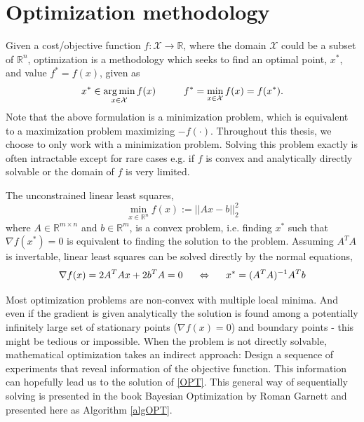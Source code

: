 \section{Optimization methodology}
Given a cost/objective function $f: \mathcal{X} \rightarrow \mathbb{R}$, where the domain
$\mathcal{X}$ could be a subset of $\mathbb{R}^n$,
optimization is a methodology which seeks to find an optimal point, $x^*$, and value
$f^* = f(x)$, given as
\begin{align}\label{OPT}
    x^* \in \operatorname*{arg\,min}_{x \in \mathcal{X}} f(x) \hspace{1cm} f^* = \min_{x \in \mathcal{X}} f(x) = f(x^*).
\end{align}
Note that the above formulation is a minimization problem, which is equivalent to a
maximization problem maximizing $-f(\cdot)$. Throughout this thesis, we choose to only work
with a minimization problem. 
Solving this problem exactly is often intractable except for rare cases e.g. if $f$ is 
convex and analytically directly solvable or the domain of $f$ is very limited.

\begin{testexample}
    The unconstrained linear least squares, $$\min_{x\in \mathbb{R}^n} f(x) := ||Ax-b||_2^2$$
    where $A \in \mathbb{R}^{m\times n}$ and $b \in \mathbb{R}^m$, is a convex problem,
    i.e. finding $x^*$ such that $\nabla f(x^*) = 0$ is equivalent to finding the solution
    to the problem. Assuming $A^TA$ is invertable, linear least squares can be solved
    directly by the normal equations, 
    $$\nabla f(x) = 2A^TAx + 2b^TA = 0 \hspace{0.5cm} \Leftrightarrow \hspace{0.5cm} x^* = (A^TA)^{-1} A^Tb$$
\end{testexample}

Most optimization problems are non-convex with multiple local minima. And even if the gradient is
given analytically the solution is found among a potentially infinitely large 
set of stationary points ($\nabla f(x) = 0$) and boundary points - this might be tedious or impossible.
When the problem is not directly solvable, mathematical optimization takes an indirect approach: 
Design a sequence of experiments that reveal information of the objective function. This information 
can hopefully lead us to the solution of \eqref{OPT}. This general way of sequentially solving 
is presented in the book Bayesian Optimization by Roman Garnett \cite{bayesoptbook} and 
presented here as Algorithm \ref{algOPT}. 

